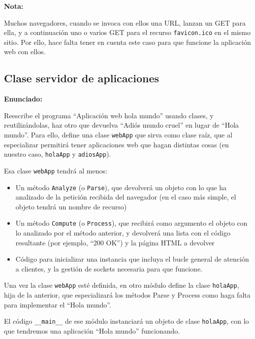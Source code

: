 \textbf{Nota:}

Muchos navegadores, cuando se invoca con ellos una URL, lanzan un GET para ella, y a continuación uno o varios GET para el recurso \texttt{favicon.ico} en el mismo sitio. Por ello, hace falta tener en cuenta este caso para que funcione la aplicación web con ellos.

\subsection{Clase servidor de aplicaciones}
\label{subsec:clase-serv-aplis}

\textbf{Enunciado:}

Reescribe el programa ``Aplicación web hola mundo'' usando clases, y reutilizándolas, haz otro que devuelva ``Adiós mundo cruel'' en lugar de ``Hola mundo''. Para ello, define una clase \texttt{webApp} que sirva como clase raíz, que al especializar permitirá tener aplicaciones web que hagan distintas cosas (en nuestro caso, \texttt{holaApp} y \texttt{adiosApp}).

Esa clase \texttt{webApp} tendrá al menos:

\begin{itemize}
\item Un método \texttt{Analyze} (o \texttt{Parse}), que devolverá un objeto con lo que ha analizado de la petición recibida del navegador (en el caso más simple, el objeto tendrá un nombre de recurso)
\item Un método \texttt{Compute} (o \texttt{Process}), que recibirá como argumento el objeto con lo analizado por el método anterior, y devolverá una lista con el código resultante (por ejemplo, ``200 OK'') y la página HTML a devolver
\item Código para inicializar una instancia que incluya el bucle general de atención a clientes, y la gestión de sockets necesaria para que funcione.
\end{itemize}

Una vez la clase \texttt{webApp} esté definida, en otro módulo define la clase \texttt{holaApp}, hija de la anterior, que especializará los métodos Parse y Process como haga falta para implementar el ``Hola mundo''.

El código \verb|__main__| de ese módulo instanciará un objeto de clase \texttt{holaApp}, con lo que tendremos una aplicación ``Hola mundo'' funcionando.

